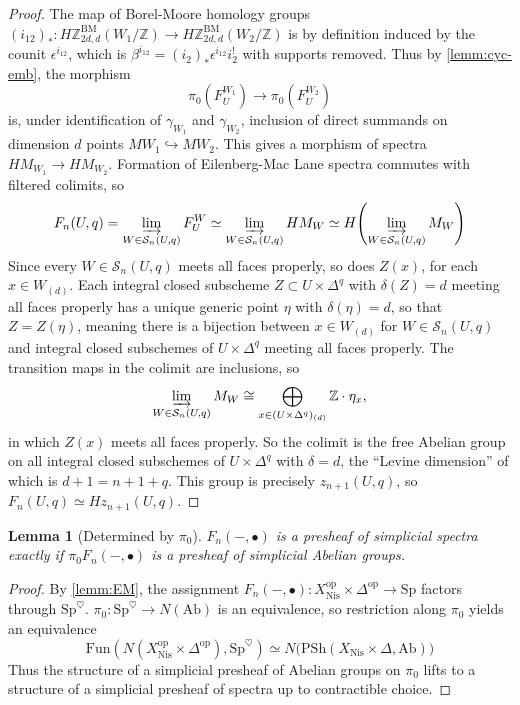 \documentclass[11pt, twoside]{article}
\numberwithin{equation}{section}
\newtheorem{lemma}[equation]{Lemma}
\theoremstyle{definition}
\newcommand{\bb}[1]{\mathbb{#1}}
\newcommand{\colim}{\varinjlim}
\newcommand{\Sp}{\mathrm{Sp}}
\newcommand{\bm}{\mathrm{BM}}
\newcommand{\psh}{\mathrm{PSh}}
\newcommand{\fun}{\mathrm{Fun}}
\newcommand{\nis}{\mathrm{Nis}}
\newcommand{\op}{\mathrm{op}}
\begin{document}
\begin{proof}
The map of Borel-Moore homology groups \((i_{12})_* \colon H\bb{Z}_{2d, d}^\bm(W_1/\bb{Z}) \to H\bb{Z}_{2d, d}^\bm(W_2/\bb{Z})\) is by definition induced by the counit \(\epsilon^{i_{12}}\), which is \(\beta^{i_{12}} = (i_2)_* \epsilon^{i_{12}} i_2^!\) with supports removed. Thus by \ref{lemm:cyc-emb}, the morphism 
\[\pi_0 \! \left(F_U^{W_1}\right) \to \pi_0 \! \left(F_U^{W_2}\right)\]
is, under identification of \(\gamma_{W_1}\) and \(\gamma_{W_2}\), inclusion of direct summands on dimension \(d\) points \(MW_1 \hookrightarrow MW_2\). This gives a morphism of spectra \(HM_{W_1} \to HM_{W_2}\). Formation of Eilenberg-Mac Lane spectra commutes with filtered colimits, so 
\[F_n(U, q) = \colim_{W \in \mathcal{S}_n(U, q)} F_U^W \simeq \colim_{W \in \mathcal{S}_n(U, q)} HM_W \simeq H \! \left(\colim_{W \in \mathcal{S}_n(U, q)} M_W\right)\]
Since every \(W \in \mathcal{S}_n(U, q)\) meets all faces properly, so does \(Z(x)\), for each \(x \in W_{(d)}\). Each integral closed subscheme \(Z \subset U \times \Delta^q\) with \(\delta(Z) = d\) meeting all faces properly has a unique generic point \(\eta\) with \(\delta(\eta) = d\), so that \(Z = Z(\eta)\), meaning there is a bijection between \(x \in W_{(d)}\) for \(W \in \mathcal{S}_n(U, q)\) and integral closed subschemes of \(U \times \Delta^q\) meeting all faces properly. The transition maps in the colimit are inclusions, so 
\[\colim_{W \in \mathcal{S}_n(U, q)} M_W \cong \bigoplus_{x \in (U \times \Delta^q)_{(d)}} \bb{Z} \cdot \eta_x,\]
in which \(Z(x)\) meets all faces properly. So the colimit is the free Abelian group on all integral closed subschemes of \(U \times \Delta^q\) with \(\delta = d\), the ``Levine dimension'' of which is \(d + 1 = n + 1 + q\). This group is precisely \(z_{n + 1}(U, q)\), so \(F_n(U, q) \simeq Hz_{n + 1}(U, q)\).
\end{proof}

\begin{lemma}[Determined by \(\pi_0\)]\label{lemm:pi-nought}
\(F_n( -, \bullet)\) is a presheaf of simplicial spectra exactly if \(\pi_0 F_n( -, \bullet)\) is a presheaf of simplicial Abelian groups.
\end{lemma}

\begin{proof}
By \ref{lemm:EM}, the assignment \(F_n( -, \bullet) \colon X_\nis^\op \times \Delta^\op \to \Sp\) factors through \(\Sp^\heartsuit\). \(\pi_0 \colon \Sp^\heartsuit \to N(\mathrm{Ab})\) is an equivalence, so restriction along \(\pi_0\) yields an equivalence 
\[\fun \! \left( \!N(X_\nis^\op \times \Delta^\op), \Sp^\heartsuit\right) \simeq N\big(\psh(X_\nis \times \Delta, \mathrm{Ab})\big)\]
Thus the structure of a simplicial presheaf of Abelian groups on \(\pi_0\) lifts to a structure of a simplicial presheaf of spectra up to contractible choice.
\end{proof}
\end{document}
